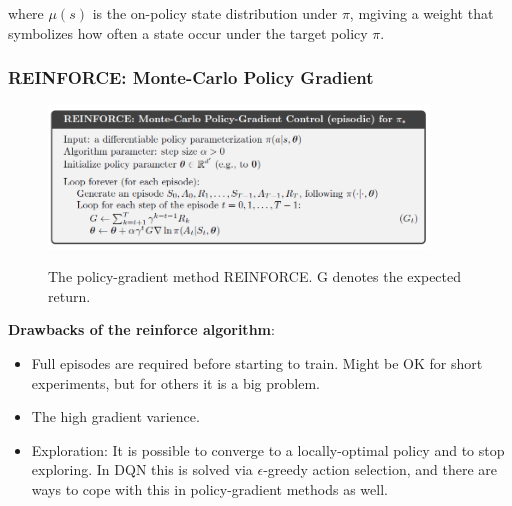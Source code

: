 where $\mu(s)$ is the on-policy state distribution under $\pi$, mgiving a weight that symbolizes how often a state occur under the target policy $\pi$.

\subsubsection{REINFORCE: Monte-Carlo Policy Gradient}

\begin{figure}[h]
    \centering
        \includegraphics[width=0.9\textwidth]{figures/solving/policy_gradient/reinforce.PNG}\\
        \caption{The policy-gradient method REINFORCE. G denotes the expected return.}
        \label{fig:gpi}
\end{figure}

\textbf{Drawbacks of the reinforce algorithm}:
\begin{itemize}
    \item Full episodes are required before starting to train. Might be OK for short experiments, but for others it is a big problem.
    \item The high gradient varience.
    \item Exploration: It is possible to converge to a locally-optimal policy and to stop exploring. In DQN this is solved via $\epsilon$-greedy action selection, and there are ways to cope with this in policy-gradient methods as well.
\end{itemize}

